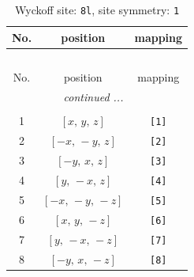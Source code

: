 \documentclass[fleqn,8pt]{jsarticle}
\begin{document}
\renewcommand{\arraystretch}{1.2}
\begin{longtable}{ccc}
\caption{Wyckoff site: {\tt 8l}, site symmetry: {\tt 1}}
 \\
 \hline \hline
No. & position & mapping \\ \hline \endfirsthead

\multicolumn{2}{l}{\tablename\ \thetable{}} \\
 \hline \hline
No. & position & mapping \\ \hline \endhead

 \hline \hline
\multicolumn{2}{r}{\footnotesize\it continued ...} \\ \endfoot

 \hline \hline
\multicolumn{2}{r}{} \\ \endlastfoot

1 & $\left[ x,\, y,\, z \right]$ & {\tt [1]} \\ \hline
2 & $\left[ - x,\, - y,\, z \right]$ & {\tt [2]} \\ \hline
3 & $\left[ - y,\, x,\, z \right]$ & {\tt [3]} \\ \hline
4 & $\left[ y,\, - x,\, z \right]$ & {\tt [4]} \\ \hline
5 & $\left[ - x,\, - y,\, - z \right]$ & {\tt [5]} \\ \hline
6 & $\left[ x,\, y,\, - z \right]$ & {\tt [6]} \\ \hline
7 & $\left[ y,\, - x,\, - z \right]$ & {\tt [7]} \\ \hline
8 & $\left[ - y,\, x,\, - z \right]$ & {\tt [8]} \\
\end{longtable}
\end{document}
